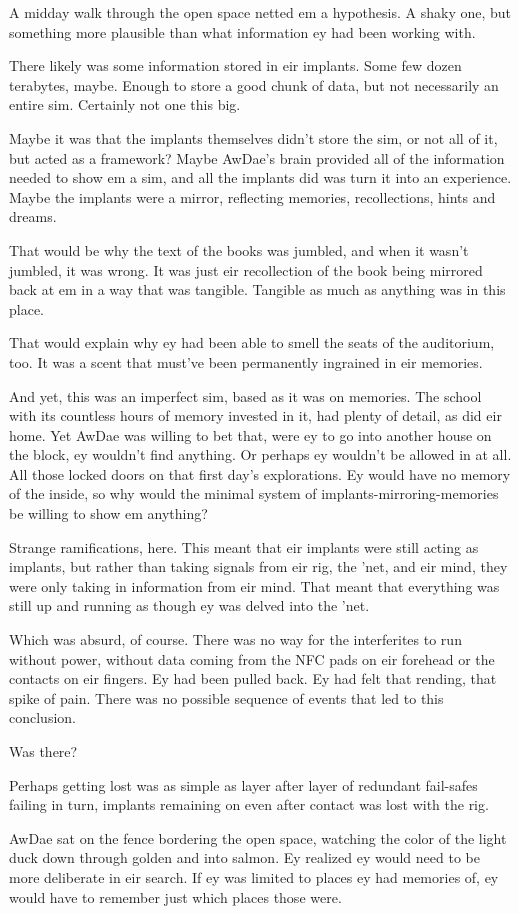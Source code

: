 A midday walk through the open space netted em a hypothesis. A shaky one, but something more plausible than what information ey had been working with.

There likely was some information stored in eir implants. Some few dozen terabytes, maybe. Enough to store a good chunk of data, but not necessarily an entire sim. Certainly not one this big.

Maybe it was that the implants themselves didn't store the sim, or not all of it, but acted as a framework? Maybe AwDae's brain provided all of the information needed to show em a sim, and all the implants did was turn it into an experience. Maybe the implants were a mirror, reflecting memories, recollections, hints and dreams.

That would be why the text of the books was jumbled, and when it wasn't jumbled, it was wrong. It was just eir recollection of the book being mirrored back at em in a way that was tangible. Tangible as much as anything was in this place.

That would explain why ey had been able to smell the seats of the auditorium, too. It was a scent that must've been permanently ingrained in eir memories.

And yet, this was an imperfect sim, based as it was on memories. The school with its countless hours of memory invested in it, had plenty of detail, as did eir home. Yet AwDae was willing to bet that, were ey to go into another house on the block, ey wouldn't find anything. Or perhaps ey wouldn't be allowed in at all. All those locked doors on that first day's explorations. Ey would have no memory of the inside, so why would the minimal system of implants-mirroring-memories be willing to show em anything?

Strange ramifications, here. This meant that eir implants were still acting as implants, but rather than taking signals from eir rig, the 'net, and eir mind, they were only taking in information from eir mind. That meant that everything was still up and running as though ey was delved into the 'net.

Which was absurd, of course. There was no way for the interferites to run without power, without data coming from the NFC pads on eir forehead or the contacts on eir fingers. Ey had been pulled back. Ey had felt that rending, that spike of pain. There was no possible sequence of events that led to this conclusion.

Was there?

Perhaps getting lost was as simple as layer after layer of redundant fail-safes failing in turn, implants remaining on even after contact was lost with the rig.

AwDae sat on the fence bordering the open space, watching the color of the light duck down through golden and into salmon. Ey realized ey would need to be more deliberate in eir search. If ey was limited to places ey had memories of, ey would have to remember just which places those were.
